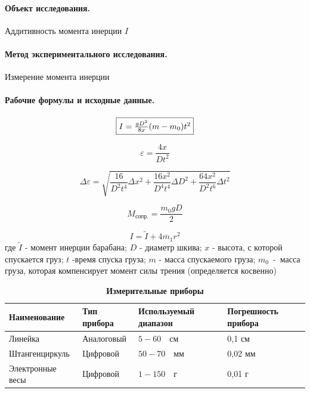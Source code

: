 \documentclass{article}
\begin{document}
\paragraph{Объект исследования.}
Аддитивность момента инерции $I$

\paragraph{Метод экспериментального исследования.}
Измерение момента инерции

 \paragraph{Рабочие формулы и исходные данные.}\hypertarget{formuls}{}
 \begin{equation}
 	\fbox{$I=\frac{g D^2}{8x}(m-m_0)t^2$}
 \end{equation}

\begin{equation}
	\varepsilon=\frac{4x}{Dt^2}
\end{equation}

\begin{equation}
	\Delta \varepsilon=\sqrt{\frac{16}{D^2t^4}\Delta x^2+\frac{16x^2}{D^4t^4}\Delta D^2+\frac{64x^2}{D^2t^6}\Delta t^2}
\end{equation}

\begin{equation}
	M_{\mbox{сопр.}}=\frac{m_0gD}{2}
\end{equation}

\begin{equation}
	I=\tilde{I}+4\overline{m}_1r^2
\end{equation}
где $\tilde{I}$ - момент инерции барабана; $D$ - диаметр шкива; $x$ - высота, с которой спускается груз; $ t $ -время спуска груза; $m$ - масса спускаемого груза; $m_0$~-~масса груза, которая компенсирует момент силы трения (определяется косвенно)



\begin{table}[h]
	\caption{\bf Измерительные приборы}
	\begin{tabular}[c]{|p{7.5em}|p{7.5em}|p{7.5em}| p{7.5em}|}
		\hline
		Наименование & Тип прибора & Используемый диапазон & Погрешность прибора\\\hline
		Линейка & Аналоговый & $5 - 60\quad\mbox{см}$ & 0,1 см\\
		\hline
		Штангенциркуль& Цифровой&$50-70\quad\mbox{мм}$&0,02 мм\\
		\hline
		Электронные весы& Цифровой & $1 - 150\quad\mbox{г}$ & 0,01 г \\
		\hline
	\end{tabular}
\end{table}
\end{document}
